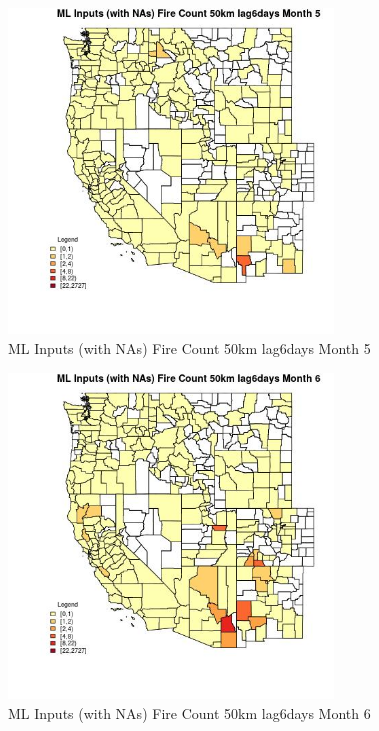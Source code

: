\begin{figure} 
\centering  
\includegraphics[width=0.77\textwidth]{Code_Outputs/Report_ML_input_PM25_Step4_part_f_de_duplicated_aveswNAs_CountyFire_Count_50km_lag6daysmedianMonth5.jpg} 
\caption{\label{fig:Report_ML_input_PM25_Step4_part_f_de_duplicated_aveswNAsCountyFire_Count_50km_lag6daysmedianMonth5}ML Inputs (with NAs) Fire Count 50km lag6days Month 5} 
\end{figure} 
 

\begin{figure} 
\centering  
\includegraphics[width=0.77\textwidth]{Code_Outputs/Report_ML_input_PM25_Step4_part_f_de_duplicated_aveswNAs_CountyFire_Count_50km_lag6daysmedianMonth6.jpg} 
\caption{\label{fig:Report_ML_input_PM25_Step4_part_f_de_duplicated_aveswNAsCountyFire_Count_50km_lag6daysmedianMonth6}ML Inputs (with NAs) Fire Count 50km lag6days Month 6} 
\end{figure} 
 

